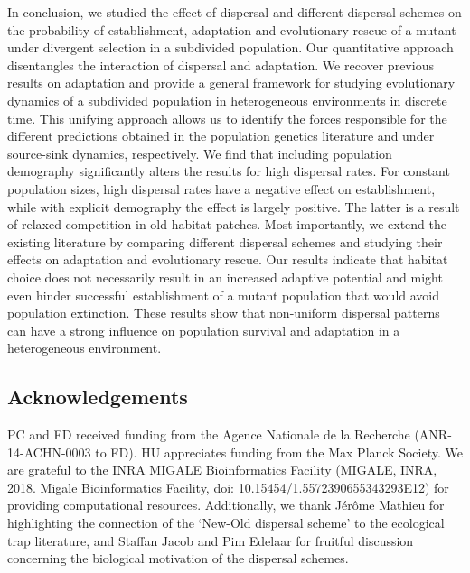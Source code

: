 \documentclass[a4paper,11pt]{article}
\newcommand{\chg}[1]{\textcolor{change}{#1}}
\begin{document}
In conclusion, we studied the effect of dispersal and different dispersal schemes on the probability of establishment, adaptation and evolutionary rescue of a mutant under divergent selection in a subdivided population. Our quantitative approach disentangles the interaction of dispersal and adaptation. We recover previous results on adaptation and provide a general framework for studying evolutionary dynamics of a subdivided population in heterogeneous environments \chg{in discrete time}. This unifying approach allows us to identify the forces responsible for the different predictions obtained in the population genetics literature and under source-sink dynamics, respectively. We find that including population demography significantly alters the results for high dispersal rates. For constant population sizes, high dispersal rates have a negative effect on establishment, while with explicit demography the effect is largely positive. The latter is a result of relaxed competition in old-habitat patches. Most importantly, we extend the existing literature by comparing different dispersal schemes and studying their effects on adaptation and evolutionary rescue. Our results indicate that habitat choice does not necessarily result in an increased adaptive potential and might even hinder successful establishment of a mutant population that would avoid population extinction.  %
These results show that non-\chg{uniform} dispersal patterns can have a strong influence on population survival and adaptation in a heterogeneous environment. 

\subsection*{Acknowledgements}
PC and FD received funding from the Agence Nationale de la Recherche (ANR-14-ACHN-0003 to FD). HU appreciates funding from the Max Planck Society. We are grateful to the INRA MIGALE Bioinformatics Facility (MIGALE, INRA, 2018. Migale Bioinformatics Facility, doi: 10.15454/1.5572390655343293E12) for providing computational resources. Additionally, we thank J\'{e}r\^{o}me Mathieu for highlighting the connection of the `New-Old dispersal scheme' to the ecological trap literature, and Staffan Jacob and Pim Edelaar for fruitful discussion concerning the biological motivation of the dispersal schemes. 



\end{document}
